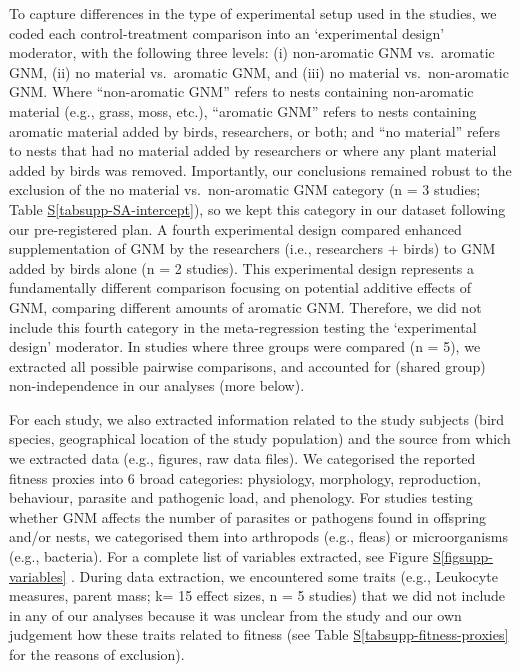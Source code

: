 \documentclass[
  number,
  review,
  onecolumn]{elsarticle}
\newcommand*\quartofigsuppref[1]{Figure \hyperref[#1]{S\ref{#1}}}
\newcommand*\quartotabsuppref[1]{Table \hyperref[#1]{S\ref{#1}}}
\begin{document}
To capture differences in the type of experimental setup used in the
studies, we coded each control-treatment comparison into an
`experimental design' moderator, with the following three levels: (i)
non-aromatic GNM vs.~aromatic GNM, (ii) no material vs.~aromatic GNM,
and (iii) no material vs.~non-aromatic GNM. Where ``non-aromatic GNM''
refers to nests containing non-aromatic material (e.g., grass, moss,
etc.), ``aromatic GNM'' refers to nests containing aromatic material
added by birds, researchers, or both; and ``no material'' refers to
nests that had no material added by researchers or where any plant
material added by birds was removed. Importantly, our conclusions
remained robust to the exclusion of the no material vs.~non-aromatic GNM
category (n = 3 studies; \quartotabsuppref{tabsupp-SA-intercept}), so we
kept this category in our dataset following our pre-registered plan. A
fourth experimental design compared enhanced supplementation of GNM by
the researchers (i.e., researchers + birds) to GNM added by birds alone
(n = 2 studies). This experimental design represents a fundamentally
different comparison focusing on potential additive effects of GNM,
comparing different amounts of aromatic GNM. Therefore, we did not
include this fourth category in the meta-regression testing the
`experimental design' moderator. In studies where three groups were
compared (n = 5), we extracted all possible pairwise comparisons, and
accounted for (shared group) non-independence in our analyses (more
below).

For each study, we also extracted information related to the study
subjects (bird species, geographical location of the study population)
and the source from which we extracted data (e.g., figures, raw data
files). We categorised the reported fitness proxies into 6 broad
categories: physiology, morphology, reproduction, behaviour, parasite
and pathogenic load, and phenology. For studies testing whether GNM
affects the number of parasites or pathogens found in offspring and/or
nests, we categorised them into arthropods (e.g., fleas) or
microorganisms (e.g., bacteria). For a complete list of variables
extracted, see \quartofigsuppref{figsupp-variables} . During data
extraction, we encountered some traits (e.g., Leukocyte measures, parent
mass; k= 15 effect sizes, n = 5 studies) that we did not include in any
of our analyses because it was unclear from the study and our own
judgement how these traits related to fitness (see
\quartotabsuppref{tabsupp-fitness-proxies} for the reasons of
exclusion).
\end{document}
